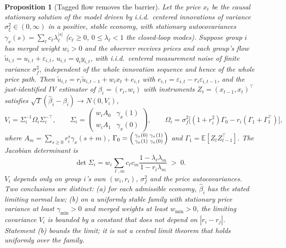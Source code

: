\documentclass[12pt]{article}
\newtheorem{proposition}[theorem]{Proposition}
\theoremstyle{definition}
\theoremstyle{remark}
\newcommand{\E}{\mathbb{E}}
\begin{document}
\begin{proposition}[Tagged flow removes the barrier]\label{prop:tagged}
Let the price $x_t$ be the causal stationary solution of the model driven by i.i.d.\ centered innovations of variance $\sigma_\xi^2\in(0,\infty)$ in a positive, stable economy, with stationary autocovariances $\gamma_x(s)=\sum_\ell c_\ell\lambda_\ell^{|s|}$ ($c_\ell\ge0$, $0\le\lambda_\ell<1$ the closed-loop modes). Suppose group $i$ has merged weight $w_i>0$ and the observer receives prices and each group's flow $\tilde u_{i,t}=u_{i,t}+\varepsilon_{i,t}$, $u_{i,t}=q_iy_{i,t}$, with i.i.d.\ centered measurement noise of finite variance $\sigma_f^2$, independent of the whole innovation sequence and hence of the whole price path. Then $\tilde u_{i,t}=r_i\tilde u_{i,t-1}+w_ix_t+e_{i,t}$ with $e_{i,t}=\varepsilon_{i,t}-r_i\varepsilon_{i,t-1}$, and the just-identified IV estimator of $\beta_i=(r_i,w_i)$ with instruments $Z_t=(x_{t-1},x_t)^\top$ satisfies $\sqrt T(\hat\beta_i-\beta_i)\to N(0,V_i)$,
\begin{equation}\label{eq:ivvar}
V_i=\Sigma_i^{-1}\Omega_i\Sigma_i^{-\top},\qquad \Sigma_i=\begin{pmatrix}w_iA_0&\gamma_x(1)\\ w_iA_1&\gamma_x(0)\end{pmatrix},\qquad \Omega_i=\sigma_f^2\bigl[(1+r_i^2)\Gamma_0-r_i(\Gamma_1+\Gamma_1^\top)\bigr],
\end{equation}
where $A_m=\sum_{s\ge0}r_i^s\gamma_x(s+m)$, $\Gamma_0=\begin{psmallmatrix}\gamma_x(0)&\gamma_x(1)\\ \gamma_x(1)&\gamma_x(0)\end{psmallmatrix}$ and $\Gamma_1=\E[Z_tZ_{t-1}^\top]$. The Jacobian determinant is
\begin{equation}\label{eq:ivdet}
\det\Sigma_i=w_i\sum_{\ell,m}c_\ell c_m\frac{1-\lambda_\ell\lambda_m}{1-r_i\lambda_m}\;>\;0 .
\end{equation}
$V_i$ depends only on group $i$'s own $(w_i,r_i)$, $\sigma_f^2$ and the price autocovariances. Two conclusions are distinct: (a) for each admissible economy, $\hat\beta_i$ has the stated limiting normal law; (b) on a uniformly stable family with stationary price variance at least $\gamma_{\min}>0$ and merged weights at least $w_{\min}>0$, the limiting covariance $V_i$ is bounded by a constant that does not depend on $|r_i-r_j|$. Statement (b) bounds the limit; it is not a central limit theorem that holds uniformly over the family.
\end{proposition}
\end{document}
